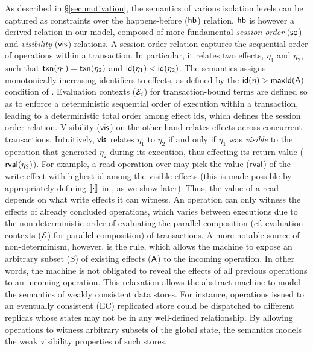 As described in \S\ref{sec:motivation}, the semantics of various
isolation levels can be captured as constraints over the
happens-before ($\textsf{hb}$) relation. $\textsf{hb}$ is however a derived relation
in our model, composed of more fundamental \emph{session order}
($\textsf{so}$) and \emph{visibility} ($\textsf{vis}$) relations.  A session order
relation captures the sequential order of operations within a
transaction. In particular, it relates two effects, $\eta_1$ and
$\eta_2$, such that $\textsf{txn}(\eta_1) = \textsf{txn}(\eta_2)$ and $\textsf{id}(\eta_1) <
\textsf{id}(\eta_2)$.  The semantics assigns monotonically increasing
identifiers to effects, as defined by the $\textsf{id}(\eta) > \textsf{maxId}(\textsf{A})$
condition of .  Evaluation contexts ($\mathcal{E}_i$) for
transaction-bound terms are defined so as to enforce a deterministic
sequential order of execution within a transaction, leading to a
deterministic total order among effect ids, which defines the session
order relation. Visibility ($\textsf{vis}$) on the other hand relates effects
across concurrent transactions.  Intuitively, $\textsf{vis}$ relates $\eta_1$
to $\eta_2$ if and only if $\eta_1$ was \emph{visible} to the
operation that generated $\eta_2$ during its execution, thus effecting
its return value ($\textsf{rval}(\eta_2)$). For example, a read operation over
 may pick the value ($\textsf{rval}$) of the write effect with highest id
among the visible effects (this is made possible by appropriately
defining $\llbracket \cdot \rrbracket$ in , as we show
later). Thus, the value of a read depends on what write effects it can
witness. An operation can only witness the effects of already
concluded operations, which varies between executions due to the
non-deterministic order of evaluating the parallel composition
(cf. evaluation contexts ($\mathcal{E}$) for parallel composition) of
transactions. A more notable source of non-determinism, however, is
the  rule, which allows the machine to expose an
arbitrary subset ($S$) of existing effects ($\textsf{A}$) to the incoming
operation. In other words, the machine is not obligated to reveal the
effects of all previous operations to an incoming operation. This
relaxation allows the abstract machine to model the semantics of
weakly consistent data stores. For instance, operations issued to an
eventually consistent (EC) replicated store could be dispatched to
different replicas whose states may not be in any well-defined
relationship. By allowing operations to witness arbitrary subsets of
the global state, the semantics models the weak visibility properties
of such stores.

